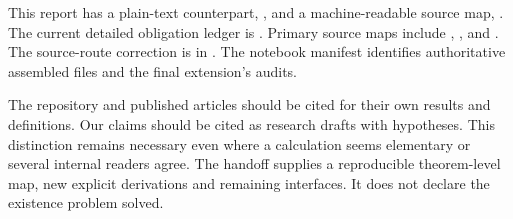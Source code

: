 This report has a plain-text
counterpart,
,
and a machine-readable source map,
.
The current detailed obligation
ledger is
.
Primary source maps include
,
,
and
.
The source-route correction is
in .
The notebook manifest identifies
authoritative assembled files
and the final extension's audits.

The repository and published
articles should be cited for
their own results and definitions.
Our claims should be cited as
research drafts with hypotheses.
This distinction remains necessary
even where a calculation seems
elementary or several internal
readers agree. The handoff supplies
a reproducible theorem-level map,
new explicit derivations and
remaining interfaces. It does
not declare the existence
problem solved.
